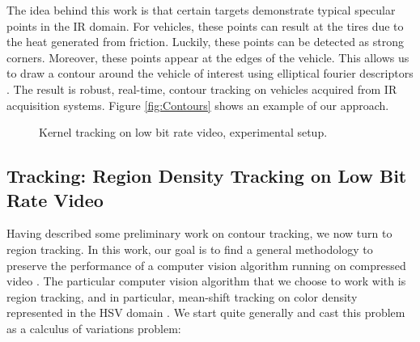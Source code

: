 \documentclass[12pt,letterpaper,doublespaced,ETD,proposal]{gt-ece-thesis}
\begin{document}
\begin{Body}
The idea behind this work is that certain targets demonstrate typical specular points in the IR domain.  For vehicles, these points can result at the tires due to the heat generated from friction.  Luckily, these points can be detected as strong corners.  Moreover, these points appear at the edges of the vehicle.  This allows us to draw a contour around the vehicle of interest using elliptical fourier descriptors \cite{1982_JNL_EllipticalFourier_Kuhl}.  The result is robust, real-time, contour tracking on vehicles acquired from IR acquisition systems.  Figure \ref{fig:Contours} shows an example of our approach.  

						\begin{figure}
						\centering
							\caption{Kernel tracking on low bit rate video, experimental setup.} 	
						\label{fig:KernelTracking_ExperimentalSetup}	
						\end{figure}


\subsection{Tracking: Region Density Tracking on Low Bit Rate Video}
Having described some preliminary work on contour tracking, we now turn to region tracking.  In this work, our goal is to find a general methodology to preserve the performance of a computer vision algorithm running on compressed video \cite{2009_CNF_CVcompMS1_Aslam}.  The particular computer vision algorithm that we choose to work with is region tracking, and in particular, mean-shift tracking on color density represented in the HSV domain \cite{2002_JNL_MeanShift_Comaniciu}.  We start quite generally and cast this problem as a calculus of variations problem:


\end{Body}
\end{document}
